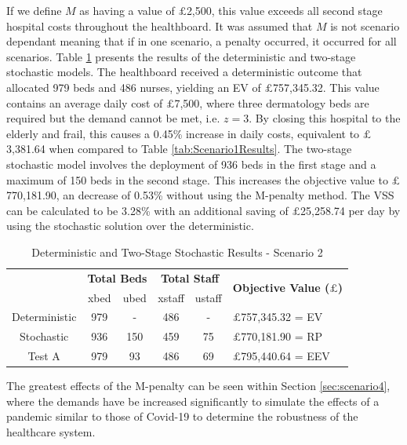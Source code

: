 \documentclass[../thesis.tex]{subfiles}
\begin{document}
If we define $M$ as having a value of $\pounds$2,500, this value exceeds all second stage hospital costs throughout the healthboard. It was assumed that $M$ is not scenario dependant meaning that if in one scenario, a penalty occurred, it occurred for all scenarios. Table \ref{tab:Scenario2Results} presents the results of the deterministic and two-stage stochastic models. The healthboard received a deterministic outcome that allocated 979 beds and 486 nurses, yielding an EV of $\pounds$757,345.32. This value contains an average daily cost of $\pounds$7,500, where three dermatology beds are required but the demand cannot be met, i.e. $z=3$. By closing this hospital to the elderly and frail, this causes a 0.45\% increase in daily costs, equivalent to $\pounds$3,381.64 when compared to Table \ref{tab:Scenario1Results}. The two-stage stochastic model involves the deployment of 936 beds in the first stage and a maximum of 150 beds in the second stage. This increases the objective value to $\pounds$770,181.90, an decrease of 0.53\% without using the M-penalty method. The VSS can be calculated to be 3.28\% with an additional saving of $\pounds$25,258.74 per day by using the stochastic solution over the deterministic.

\begin{table}[h!]
    \centering
    \begin{tabular}{cccccl}\toprule
 & \multicolumn{2}{l}{\textbf{Total Beds}} & \multicolumn{2}{c}{\textbf{Total Staff}} & \multirow{2}{*}{\textbf{Objective Value ($\pounds$)}}\\ \cmidrule(lr){2-3} \cmidrule(lr){4-5}
         
 & xbed           & ubed          & xstaff         & ustaff         \\ \midrule
 Deterministic & 979  & - & 486 & - &$\pounds$757,345.32 = EV \\
 Stochastic & 936 & 150 & 459 & 75 & $\pounds$770,181.90 = RP \\
 Test A & 979 & 93 & 486 & 69 & $\pounds$795,440.64 = EEV \\\bottomrule
    \end{tabular}
    \caption{Deterministic and Two-Stage Stochastic Results - Scenario 2}
    \label{tab:Scenario2Results}
\end{table}


The greatest effects of the M-penalty can be seen within Section \ref{sec:scenario4}, where the demands have be increased significantly to simulate the effects of a pandemic similar to those of Covid-19 to determine the robustness of the healthcare system.
\end{document}
